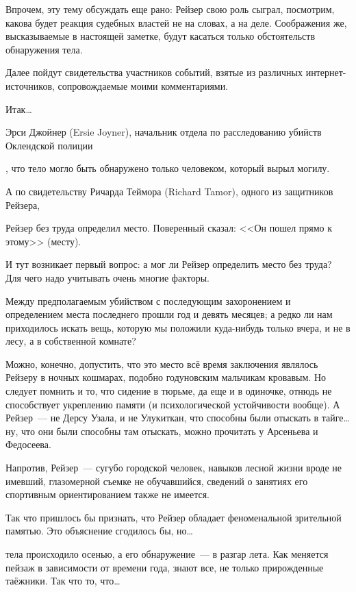 Впрочем, эту тему обсуждать еще рано: Рейзер свою роль сыграл, посмотрим, какова будет реакция судебных властей не на словах, а на деле. Соображения же, высказываемые в настоящей заметке, будут касаться только обстоятельств обнаружения тела. 

Далее пойдут свидетельства участников событий, взятые из различных интернет-источников, сопровождаемые моими комментариями. 

Итак\dots 

Эрси Джойнер (Ersie Joyner), начальник отдела по расследованию убийств Оклендской полиции 


\begin{shadequote}{}
, что тело могло быть обнаружено только человеком, который вырыл могилу. 
\end{shadequote}

А по свидетельству Ричарда Теймора (Richard Tamor), одного из защитников Рейзера, 


\begin{shadequote}{}
Рейзер без труда определил место. Поверенный сказал: <<Он пошел прямо к этому>> (месту). 
\end{shadequote}

И тут возникает первый вопрос: а мог ли Рейзер определить место без труда? Для чего надо учитывать очень многие факторы. 

Между предполагаемым убийством с последующим захоронением и определением места последнего прошли год и девять месяцев; а редко ли нам приходилось искать вещь, которую мы положили куда-нибудь только вчера, и не в лесу, а в собственной комнате? 

Можно, конечно, допустить, что это место всё время заключения являлось Рейзеру в ночных кошмарах, подобно годуновским мальчикам кровавым. Но следует помнить и то, что сидение в тюрьме, да еще и в одиночке, отнюдь не способствует укреплению памяти (и психологической устойчивости вообще). А Рейзер~--- не Дерсу Узала, и не Улукиткан, что способны были отыскать в тайге\dots ну, что они были способны там отыскать, можно прочитать у Арсеньева и Федосеева. 

Напротив, Рейзер~--- сугубо городской человек, навыков лесной жизни вроде не имевший, глазомерной съемке не обучавшийся, сведений о занятиях его спортивным ориентированием также не имеется. 

Так что пришлось бы признать, что Рейзер обладает феноменальной зрительной памятью. Это объяснение сгодилось бы, но\dots 

 тела происходило осенью, а его обнаружение~--- в разгар лета. Как меняется пейзаж в зависимости от времени года, знают все, не только прирожденные таёжники. Так что то, что\dots 


